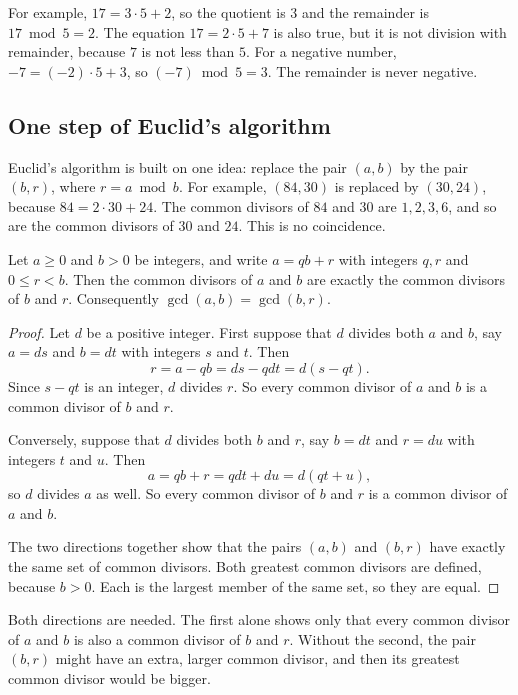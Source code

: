 For example, $17=3\cdot5+2$, so the quotient is $3$ and the remainder is $17\bmod5=2$. The equation $17=2\cdot5+7$ is also true, but it is not division with remainder, because $7$ is not less than $5$. For a negative number, $-7=(-2)\cdot5+3$, so $(-7)\bmod5=3$. The remainder is never negative.

\subsection*{One step of Euclid's algorithm}
Euclid's algorithm is built on one idea: replace the pair $(a,b)$ by the pair $(b,r)$, where $r=a\bmod b$. For example, $(84,30)$ is replaced by $(30,24)$, because $84=2\cdot30+24$. The common divisors of $84$ and $30$ are $1,2,3,6$, and so are the common divisors of $30$ and $24$. This is no coincidence.

\par\noindent\begin{minipage}{\linewidth}
\begin{lemma}\label{ch05:lem:euclid-step}
Let $a\ge0$ and $b>0$ be integers, and write $a=qb+r$ with integers $q,r$ and $0\le r<b$. Then the common divisors of $a$ and $b$ are exactly the common divisors of $b$ and $r$. Consequently $\gcd(a,b)=\gcd(b,r)$.
\end{lemma}
\end{minipage}\par

\begin{proof}
Let $d$ be a positive integer. First suppose that $d$ divides both $a$ and $b$, say $a=ds$ and $b=dt$ with integers $s$ and $t$. Then
\[
 r=a-qb=ds-qdt=d(s-qt).
\]
Since $s-qt$ is an integer, $d$ divides $r$. So every common divisor of $a$ and $b$ is a common divisor of $b$ and $r$.

Conversely, suppose that $d$ divides both $b$ and $r$, say $b=dt$ and $r=du$ with integers $t$ and $u$. Then
\[
 a=qb+r=qdt+du=d(qt+u),
\]
so $d$ divides $a$ as well. So every common divisor of $b$ and $r$ is a common divisor of $a$ and $b$.

The two directions together show that the pairs $(a,b)$ and $(b,r)$ have exactly the same set of common divisors. Both greatest common divisors are defined, because $b>0$. Each is the largest member of the same set, so they are equal.
\end{proof}

Both directions are needed. The first alone shows only that every common divisor of $a$ and $b$ is also a common divisor of $b$ and $r$. Without the second, the pair $(b,r)$ might have an extra, larger common divisor, and then its greatest common divisor would be bigger.

